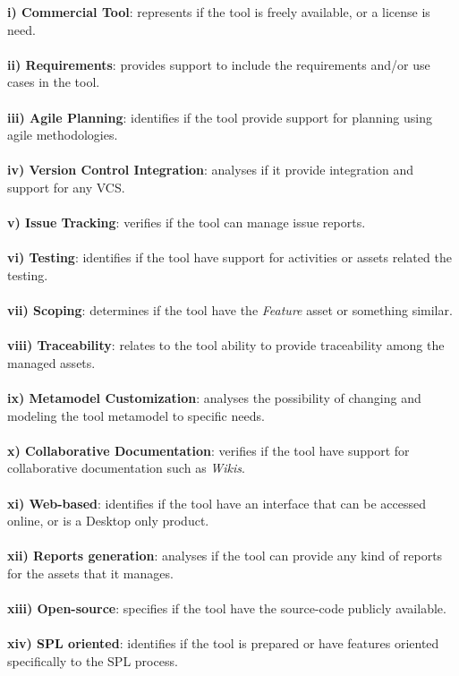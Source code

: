 \noindent\textbf{i) Commercial Tool}: represents if the tool is freely available, or a license is need.
\\
\\
\textbf{ii) Requirements}: provides support to include the requirements and/or use cases in the tool.
\\
\\
\textbf{iii) Agile Planning}: identifies if the tool provide support for planning using agile methodologies. 
\\
\\
\textbf{iv) Version Control Integration}: analyses if it provide integration and support for any \acf{VCS}.
\\
\\
\textbf{v) Issue Tracking}: verifies if the tool can manage issue reports. 
\\
\\
\textbf{vi) Testing}: identifies if the tool have support for activities or assets related the testing.
\\
\\
\textbf{vii) Scoping}: determines if the tool have the \textit{Feature} asset or something similar.
\\
\\
\textbf{viii) Traceability}: relates to the tool ability to provide traceability among the managed assets. 
\\
\\
\textbf{ix) Metamodel Customization}: analyses the possibility of changing and modeling the tool metamodel to specific needs. 
\\
\\
\textbf{x) Collaborative Documentation}: verifies if the tool have support for collaborative documentation such as \textit{Wikis}.
\\
\\
\textbf{xi) Web-based}: identifies if the tool have an interface that can be accessed online, or is a Desktop only product. 
\\
\\
\textbf{xii) Reports generation}: analyses if the tool can provide any kind of reports for the assets that it manages.
\\
\\
\textbf{xiii) Open-source}: specifies if the tool have the source-code publicly available.
\\
\\
\textbf{xiv) SPL oriented}: identifies if the tool is prepared or have features oriented specifically to the \ac{SPL} process.



